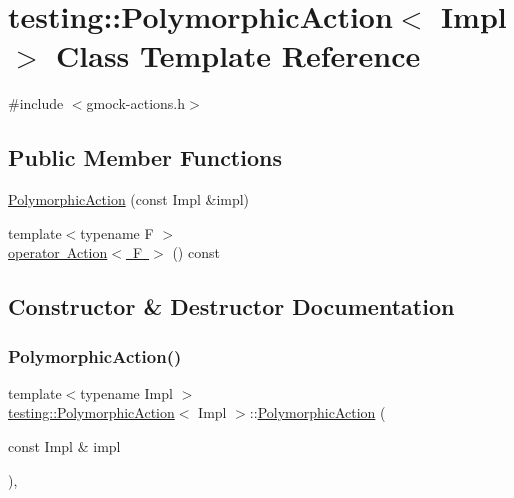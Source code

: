 \hypertarget{classtesting_1_1PolymorphicAction}{}\section{testing\+::Polymorphic\+Action$<$ Impl $>$ Class Template Reference}
\label{classtesting_1_1PolymorphicAction}


{\ttfamily \#include $<$gmock-\/actions.\+h$>$}

\subsection*{Public Member Functions}
\begin{DoxyCompactItemize}
\item 
\mbox{\hyperlink{classtesting_1_1PolymorphicAction_a062e5a45ad61dcf8085b15cc882ca0ae}{Polymorphic\+Action}} (const Impl \&impl)
\item 
{\footnotesize template$<$typename F $>$ }\\\mbox{\hyperlink{classtesting_1_1PolymorphicAction_ac35461616cc15c06f1a2f9ee1c03fb8f}{operator Action$<$ F $>$}} () const
\end{DoxyCompactItemize}


\subsection{Constructor \& Destructor Documentation}
\mbox{\label{classtesting_1_1PolymorphicAction_a062e5a45ad61dcf8085b15cc882ca0ae}} 
\subsubsection{\texorpdfstring{PolymorphicAction()}{PolymorphicAction()}}
{\footnotesize\ttfamily template$<$typename Impl $>$ \\
\mbox{\hyperlink{classtesting_1_1PolymorphicAction}{testing\+::\+Polymorphic\+Action}}$<$ Impl $>$\+::\mbox{\hyperlink{classtesting_1_1PolymorphicAction}{Polymorphic\+Action}} (\begin{DoxyParamCaption}\item[{const Impl \&}]{impl }\end{DoxyParamCaption})\hspace{0.3cm}{\ttfamily [inline]}, {\ttfamily [explicit]}}



